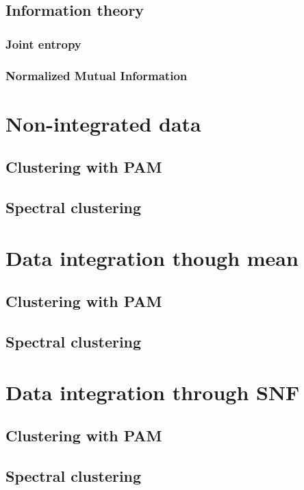\subsection{Information theory}
\subsubsection{Joint entropy}
\subsubsection{Normalized Mutual Information}

\section{Non-integrated data}\label{results_nonIntegrated}
\subsection{Clustering with PAM}
\subsection{Spectral clustering}

\section{Data integration though mean}\label{results_mean}
\subsection{Clustering with PAM}
\subsection{Spectral clustering}

\section{Data integration through SNF}\label{results_SNF}
\subsection{Clustering with PAM}
\subsection{Spectral clustering}
